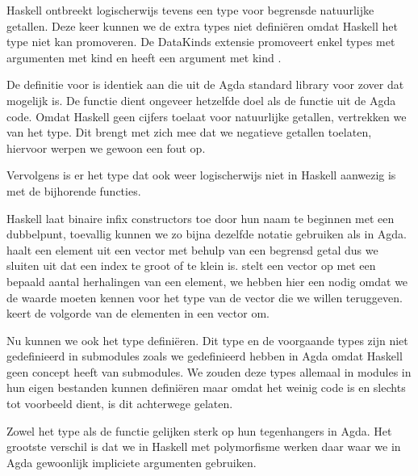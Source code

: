 Haskell ontbreekt logischerwijs tevens een type voor begrensde natuurlijke
getallen. Deze keer kunnen we de extra types niet definiëren omdat Haskell het
 type niet kan promoveren. De DataKinds extensie promoveert enkel
types met argumenten met kind \ihask{*} en  heeft een argument met
kind .


De definitie voor  is identiek aan die uit de Agda standard library
voor zover dat mogelijk is. De functie  dient ongeveer
hetzelfde doel als de  functie uit de Agda code. Omdat Haskell
geen cijfers toelaat voor natuurlijke getallen, vertrekken we van het
 type. Dit brengt met zich mee dat we negatieve getallen
toelaten, hiervoor werpen we gewoon een fout op.

Vervolgens is er het type  dat ook weer logischerwijs niet in
Haskell aanwezig is met de bijhorende functies.


Haskell laat binaire infix constructors toe door hun naam te beginnen met een
dubbelpunt, toevallig kunnen we zo bijna dezelfde notatie gebruiken als in
Agda.  haalt een element uit een vector met behulp van een
begrensd getal dus we sluiten uit dat een index te groot of te klein is.
 stelt een vector op met een bepaald aantal herhalingen van
een element, we hebben hier een  nodig omdat we de waarde
 moeten kennen voor het type van de vector die we willen teruggeven.
 keert de volgorde van de elementen in een vector om.

Nu kunnen we ook het  type definiëren. Dit type en de voorgaande
types zijn niet gedefinieerd in submodules zoals we  gedefinieerd
hebben in Agda omdat Haskell geen concept heeft van submodules. We zouden deze
types allemaal in modules in hun eigen bestanden kunnen definiëren maar omdat
het weinig code is en slechts tot voorbeeld dient, is dit achterwege gelaten.


Zowel het  type als de  functie gelijken sterk op
hun tegenhangers in Agda. Het grootste verschil is dat we in Haskell met
polymorfisme werken daar waar we in Agda gewoonlijk impliciete argumenten
gebruiken.

